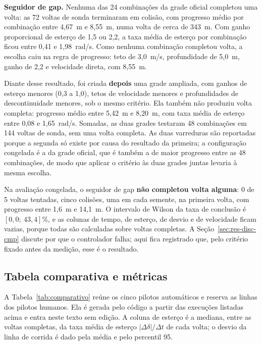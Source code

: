 \textbf{Seguidor de gap.} Nenhuma das 24 combinações da grade oficial completou
uma volta: as 72 voltas de sonda terminaram em colisão, com progresso médio por
combinação entre 4,67~m e 8,55~m, numa volta de cerca de 343~m. Com ganho
proporcional de esterço de 1,5 ou 2,2, a taxa média de esterço por combinação
ficou entre 0,41 e 1,98~rad/s. Como nenhuma combinação completou volta, a escolha
caiu na regra de progresso: teto de 3,0~m/s, profundidade de 5,0~m, ganho de 2,2 e
velocidade direta, com 8,55~m.

Diante desse resultado, foi criada \textbf{depois} uma grade ampliada, com
ganhos de esterço menores (0,3 a 1,0), tetos de velocidade menores e
profundidades de descontinuidade menores, sob o mesmo critério. Ela também não
produziu volta completa: progresso médio entre 5,42~m e 8,20~m, com taxa média
de esterço entre 0,08 e 1,65~rad/s. Somadas, as duas grades testaram 48
combinações em 144 voltas de sonda, sem uma volta completa. As duas varreduras
são reportadas porque a segunda só existe por causa do resultado da primeira; a
configuração congelada é a da grade oficial, que é também a de maior progresso
entre as 48 combinações, de modo que aplicar o critério às duas grades juntas
levaria à mesma escolha.

Na avaliação congelada, o seguidor de gap \textbf{não completou volta alguma}: 0
de 5 voltas tentadas, cinco colisões, uma em cada semente, na primeira volta,
com progresso entre 1,6~m e 14,1~m. O intervalo de Wilson da taxa de conclusão é
$[0{,}0;\ 43{,}4]$\%, e as colunas de tempo, de esterço, de desvio e de
velocidade ficam vazias, porque todas são calculadas sobre voltas completas. A
Seção~\ref{sec:res-disc-cmp} discute por que o controlador falha; aqui fica
registrado que, pelo critério fixado antes da medição, esse é o resultado.

\subsection{Tabela comparativa e métricas}\label{sec:res-cmp-tabela}

A Tabela~\ref{tab:comparativo} reúne os cinco pilotos automáticos e reserva as
linhas dos pilotos humanos. Ela é gerada pelo código a partir das execuções
listadas acima e entra neste texto sem edição. A coluna de esterço é a mediana,
entre as voltas completas, da taxa média de esterço $|\Delta\delta|/\Delta t$ de
cada volta; o desvio da linha de corrida é dado pela média e pelo percentil 95.

\begin{landscape}

\end{landscape}

